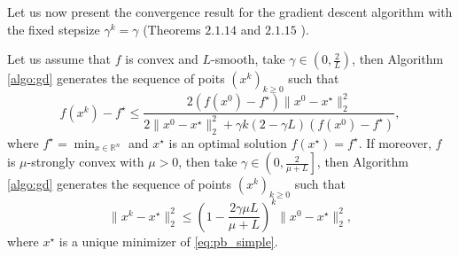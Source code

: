 Let us now present the convergence result for the gradient descent algorithm with the fixed stepsize $\gamma^k = \gamma$ (Theorems $2.1.14$ and $2.1.15$ \cite{nesterov-book}).
\begin{theorem}\label{th:gd}
Let us assume that $f$ is convex and $L$-smooth, take $\gamma\in\left(0,\frac{2}{L}\right)$, then Algorithm \ref{algo:gd} generates the sequence of poits $(x^k)_{k\geq0}$ such that 
\begin{equation}
    f(x^k) - f^\star \leq \frac{2(f(x^0)-f^\star)\|x^0-x^\star\|_2^2}{2\|x^0-x^\star\|_2^2 + \gamma k(2-\gamma L)(f(x^0) - f^\star)},
\end{equation}
where $f^\star = \min_{x\in\mathbb{R}^n}$ and $x^\star$ is an optimal solution $f(x^\star) = f^\star$.
If moreover, $f$ is $\mu$-strongly convex with $\mu>0$, then take $\gamma\in\left(0, \frac{2}{\mu + L}\right]$, then Algorithm \ref{algo:gd} generates the sequence of points $(x^k)_{k\geq0}$ such that 
\begin{equation}
\|x^k-x^\star\|_2^2\leq\left(1-\frac{2\gamma\mu L}{\mu + L}\right)^k\|x^0-x^\star\|_2^2,
\end{equation}
where $x^\star$ is a unique minimizer of \eqref{eq:pb_simple}.
\end{theorem}



